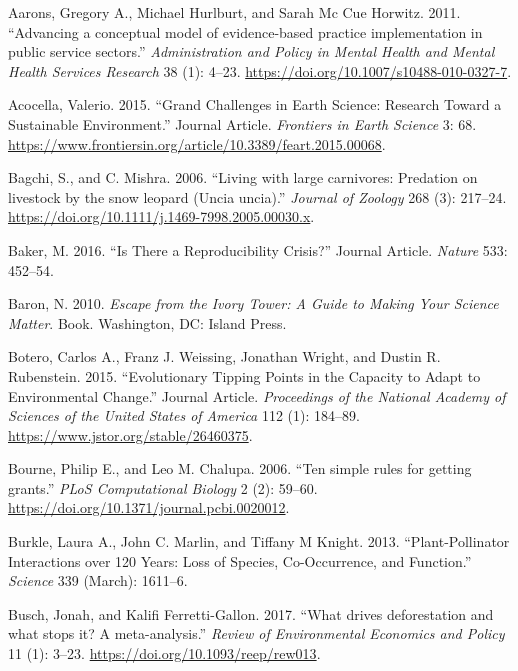 \documentclass[fleqn,10pt]{wlpeerj} %
\begin{document}
\hypertarget{refs}{}
\leavevmode\hypertarget{ref-Aarons2011}{}%
Aarons, Gregory A., Michael Hurlburt, and Sarah Mc Cue Horwitz. 2011.
``Advancing a conceptual model of evidence-based practice implementation
in public service sectors.'' \emph{Administration and Policy in Mental
Health and Mental Health Services Research} 38 (1): 4--23.
\url{https://doi.org/10.1007/s10488-010-0327-7}.

\leavevmode\hypertarget{ref-Acocella2015}{}%
Acocella, Valerio. 2015. ``Grand Challenges in Earth Science: Research
Toward a Sustainable Environment.'' Journal Article. \emph{Frontiers in
Earth Science} 3: 68.
\url{https://www.frontiersin.org/article/10.3389/feart.2015.00068}.

\leavevmode\hypertarget{ref-Bagchi2006}{}%
Bagchi, S., and C. Mishra. 2006. ``Living with large carnivores:
Predation on livestock by the snow leopard (Uncia uncia).''
\emph{Journal of Zoology} 268 (3): 217--24.
\url{https://doi.org/10.1111/j.1469-7998.2005.00030.x}.

\leavevmode\hypertarget{ref-Baker2016}{}%
Baker, M. 2016. ``Is There a Reproducibility Crisis?'' Journal Article.
\emph{Nature} 533: 452--54.

\leavevmode\hypertarget{ref-Baron2010}{}%
Baron, N. 2010. \emph{Escape from the Ivory Tower: A Guide to Making
Your Science Matter}. Book. Washington, DC: Island Press.

\leavevmode\hypertarget{ref-Botero2015}{}%
Botero, Carlos A., Franz J. Weissing, Jonathan Wright, and Dustin R.
Rubenstein. 2015. ``Evolutionary Tipping Points in the Capacity to Adapt
to Environmental Change.'' Journal Article. \emph{Proceedings of the
National Academy of Sciences of the United States of America} 112 (1):
184--89. \url{https://www.jstor.org/stable/26460375}.

\leavevmode\hypertarget{ref-Bourne2006}{}%
Bourne, Philip E., and Leo M. Chalupa. 2006. ``Ten simple rules for
getting grants.'' \emph{PLoS Computational Biology} 2 (2): 59--60.
\url{https://doi.org/10.1371/journal.pcbi.0020012}.

\leavevmode\hypertarget{ref-Burkle2013}{}%
Burkle, Laura A., John C. Marlin, and Tiffany M Knight. 2013.
``Plant-Pollinator Interactions over 120 Years: Loss of Species,
Co-Occurrence, and Function.'' \emph{Science} 339 (March): 1611--6.

\leavevmode\hypertarget{ref-Busch2017}{}%
Busch, Jonah, and Kalifi Ferretti-Gallon. 2017. ``What drives
deforestation and what stops it? A meta-analysis.'' \emph{Review of
Environmental Economics and Policy} 11 (1): 3--23.
\url{https://doi.org/10.1093/reep/rew013}.
\end{document}
